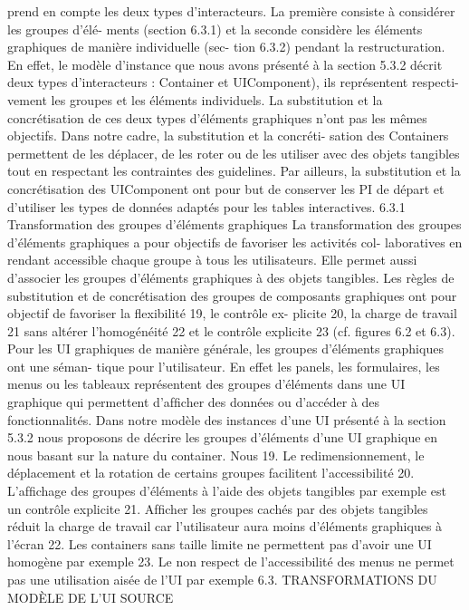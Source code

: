\documentclass{article}
\begin{document}
prend en compte les deux types d’interacteurs. La première consiste à considérer les groupes d’élé-
ments (section 6.3.1) et la seconde considère les éléments graphiques de manière individuelle (sec-
tion 6.3.2) pendant la restructuration. En effet, le modèle d’instance que nous avons présenté à la
section 5.3.2 décrit deux types d’interacteurs : Container et UIComponent), ils représentent respecti-
vement les groupes et les éléments individuels. La substitution et la concrétisation de ces deux types
d’éléments graphiques n’ont pas les mêmes objectifs. Dans notre cadre, la substitution et la concréti-
sation des Containers permettent de les déplacer, de les roter ou de les utiliser avec des objets tangibles
tout en respectant les contraintes des guidelines. Par ailleurs, la substitution et la concrétisation des
UIComponent ont pour but de conserver les PI de départ et d’utiliser les types de données adaptés
pour les tables interactives.
6.3.1
Transformation des groupes d’éléments graphiques
La transformation des groupes d’éléments graphiques a pour objectifs de favoriser les activités col-
laboratives en rendant accessible chaque groupe à tous les utilisateurs. Elle permet aussi d’associer les
groupes d’éléments graphiques à des objets tangibles. Les règles de substitution et de concrétisation
des groupes de composants graphiques ont pour objectif de favoriser la ﬂexibilité 19, le contrôle ex-
plicite 20, la charge de travail 21 sans altérer l’homogénéité 22 et le contrôle explicite 23 (cf. ﬁgures 6.2
et 6.3).
Pour les UI graphiques de manière générale, les groupes d’éléments graphiques ont une séman-
tique pour l’utilisateur. En effet les panels, les formulaires, les menus ou les tableaux représentent des
groupes d’éléments dans une UI graphique qui permettent d’afﬁcher des données ou d’accéder à des
fonctionnalités. Dans notre modèle des instances d’une UI présenté à la section 5.3.2 nous proposons
de décrire les groupes d’éléments d’une UI graphique en nous basant sur la nature du container. Nous
19. Le redimensionnement, le déplacement et la rotation de certains groupes facilitent l’accessibilité
20. L’afﬁchage des groupes d’éléments à l’aide des objets tangibles par exemple est un contrôle explicite
21. Afﬁcher les groupes cachés par des objets tangibles réduit la charge de travail car l’utilisateur aura moins d’éléments
graphiques à l’écran
22. Les containers sans taille limite ne permettent pas d’avoir une UI homogène par exemple
23. Le non respect de l’accessibilité des menus ne permet pas une utilisation aisée de l’UI par exemple
6.3. TRANSFORMATIONS DU MODÈLE DE L’UI SOURCE
\end{document}
